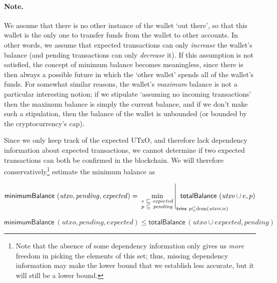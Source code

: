 \documentclass{article}
\DeclareMathOperator{\dom}{dom}
\DeclareMathOperator*{\minimum}{min}
\theoremstyle{definition}{
  \newtheorem{lemma}{Lemma}[section] %
  \newtheorem{definition}[lemma]{Definition}
}
\theoremstyle{theorem}{
  \newtheorem{invariant}[lemma]{Invariant}
  \newtheorem{proofobligation}[lemma]{Proof Obligation}
}
\numberwithin{equation}{lemma}
\begin{document}
\paragraph{Note.} We assume that there is no other instance of the wallet
`out there', so that this wallet is the only one to transfer funds
from the wallet to other accounts. In other words, we assume that expected
transactions can only \emph{increase} the wallet's balance (and pending
transactions can only \emph{decrease} it). If this assumption is not satisfied,
the concept of minimum balance becomes meaningless, since there is then always
a possible future in which the `other wallet' spends all of the wallet's
funds. For somewhat similar reasons, the wallet's \emph{maximum} balance
is not a particular interesting notion; if we stipulate `assuming no
incoming transactions' then the maximum balance is simply the current balance,
and if we don't make such a stipulation, then the balance of the wallet is
unbounded (or bounded by the cryptocurrency's cap).

Since we only keep track of the expected UTxO, and therefore lack dependency
information about expected transactions, we cannot determine if two expected
transactions can both be confirmed in the blockchain. We will therefore
conservatively\footnote{ Note that the absence of some dependency information
only gives us \emph{more} freedom in picking the elements of this set; thus,
missing dependency information may make the lower bound that we establish less
accurate, but it will still be a lower bound.} estimate the minimum balance as
%
\begin{definition}
\begin{equation*}
  \mathsf{minimumBalance} ~ (\mathit{utxo}, \mathit{pending}, \mathit{expected})
= \left.
  \minimum_{\begin{smallmatrix}
              e & \sqsubseteq & \mathit{expected} \\
              p & \subseteq   & \mathit{pending}
            \end{smallmatrix}}
  \right|_{\mathrlap{\mathsf{txins} ~ p \subseteq \dom(\mathit{utxo} \cup e)}}
  ~ \mathsf{totalBalance} ~ (\mathit{utxo} \cup e, p)
\end{equation*}
\end{definition}

\begin{lemma}
\begin{equation*}
    \mathsf{minimumBalance} ~ (\mathit{utxo}, \mathit{pending}, \mathit{expected})
\le \mathsf{totalBalance}   ~ (\mathit{utxo} \cup \mathit{expected}, \mathit{pending})
\end{equation*}
\label{lem:minimumBalance_bound}
\end{lemma}
\end{document}
